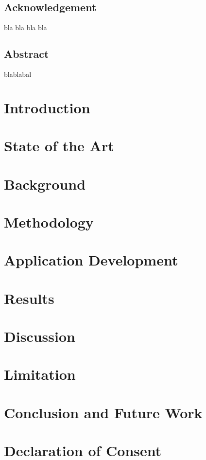 \documentclass [12pt, oneside] {book}
\begin{document}

\section*{Acknowledgement}
bla bla bla bla
\newpage
\section*{Abstract}
blablabal
\tableofcontents
\listoffigures


\printglossary[type=\acronymtype, title=Abbreviations, nonumberlist]


\chapter{Introduction}

\chapter{State of the Art}

\chapter{Background}

\chapter{Methodology}

\chapter{Application Development}

\chapter{Results}

\chapter{Discussion}

\chapter{Limitation}

\chapter{Conclusion and Future Work}





\appendix
\chapter{Declaration of Consent}

\end{document}
